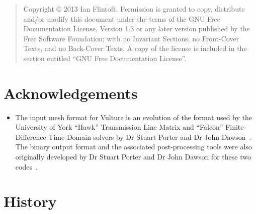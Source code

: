 \documentclass[onecolumn,a4paper]{article}
\numberwithin{equation}{section}
\begin{document}
\bigskip
\begin{quote}
    Copyright \copyright{}  2013 Ian Flintoft.
    Permission is granted to copy, distribute and/or modify this document
    under the terms of the GNU Free Documentation License, Version 1.3
    or any later version published by the Free Software Foundation;
    with no Invariant Sections, no Front-Cover Texts, and no Back-Cover Texts.
    A copy of the license is included in the section entitled ``GNU
    Free Documentation License''.
\end{quote}
\bigskip

\section*{Acknowledgements}

\begin{itemize}
 \item The input mesh format for Vulture is an evolution of the format used by
 the University of York ``Hawk'' Transmission Line Matrix and ``Falcon'' Finite-Difference
 Time-Domain solvers by Dr Stuart Porter and Dr John Dawson~\cite{hawkman,falconman}. The binary output format and 
 the associated post-processing tools were also originally developed by
 Dr Stuart Porter and Dr John Dawson for these two codes~\cite{procman}. 

\end{itemize}

\section*{History}

%
%
%
\newpage
%
\tableofcontents
%
\newpage
%
%
\end{document}
